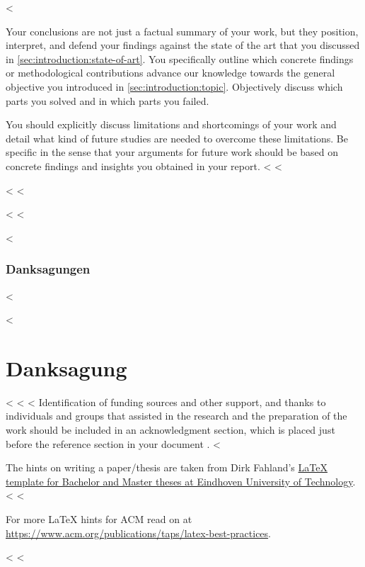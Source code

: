 \documentclass[runningheads,a4paper,ngerman]{llncs}[2022/01/12]
\begin{document}
<%

Your conclusions are not just a factual summary of your work, but they position, interpret, and defend your findings against the state of the art that you discussed in \cref{sec:introduction:state-of-art}. You specifically outline which concrete findings or methodological contributions advance our knowledge towards the general objective you introduced in \cref{sec:introduction:topic}. Objectively discuss which parts you solved and in which parts you failed.

You should explicitly discuss limitations and shortcomings of your work and detail what kind of future studies are needed to overcome these limitations. Be specific in the sense that your arguments for future work should be based on concrete findings and insights you obtained in your report.
<%
<%

<%
\label{sec:loremipsum}
\lipsum[1-4]
<%

<%
\label{sec:outlook}
\lipsum[1-2]
<%

<%
\subsubsection*{Danksagungen}

<%
\begin{acks}
<%
\section*{Danksagung}

<%
<%
<%
Identification of funding sources and other support, and thanks to individuals and groups that assisted in the research and the preparation of the work should be included in an acknowledgment section, which is placed just before the reference section in your document \cite{acmart}.
<%

The hints on writing a paper/thesis are taken from Dirk Fahland's \href{https://github.com/dfahland/Master-or-Bachelor-thesis-Template-Eindhoven-University-of-Technology}{LaTeX template for Bachelor and Master theses at Eindhoven University of Technology}.
<%
<%

For more \LaTeX{} hints for ACM read on at \url{https://www.acm.org/publications/taps/latex-best-practices}.
\end{acks}
<%
<%
\end{document}
